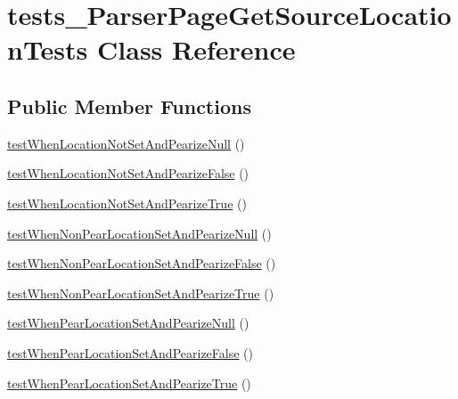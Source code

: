 \hypertarget{classtests___parser_page_get_source_location_tests}{\section{tests\-\_\-\-Parser\-Page\-Get\-Source\-Location\-Tests \-Class \-Reference}
\label{classtests___parser_page_get_source_location_tests}
}
\subsection*{\-Public \-Member \-Functions}
\begin{DoxyCompactItemize}
\item 
\hyperlink{classtests___parser_page_get_source_location_tests_ac721171dfac4984a048e8f71b69d5209}{test\-When\-Location\-Not\-Set\-And\-Pearize\-Null} ()
\item 
\hyperlink{classtests___parser_page_get_source_location_tests_adee1f0a89955b2592f877ae21b1b47b1}{test\-When\-Location\-Not\-Set\-And\-Pearize\-False} ()
\item 
\hyperlink{classtests___parser_page_get_source_location_tests_a053821b7694df0e44f991e7fbce97853}{test\-When\-Location\-Not\-Set\-And\-Pearize\-True} ()
\item 
\hyperlink{classtests___parser_page_get_source_location_tests_ac6de50e08eb4d513dcbe9390221a74dd}{test\-When\-Non\-Pear\-Location\-Set\-And\-Pearize\-Null} ()
\item 
\hyperlink{classtests___parser_page_get_source_location_tests_ad6c809f37460a96ddd5026a5d7420f6c}{test\-When\-Non\-Pear\-Location\-Set\-And\-Pearize\-False} ()
\item 
\hyperlink{classtests___parser_page_get_source_location_tests_a94bfc35295afbf47a5b1eb7883e508c6}{test\-When\-Non\-Pear\-Location\-Set\-And\-Pearize\-True} ()
\item 
\hyperlink{classtests___parser_page_get_source_location_tests_a37e70815dfa80be80feff06e6c9d240e}{test\-When\-Pear\-Location\-Set\-And\-Pearize\-Null} ()
\item 
\hyperlink{classtests___parser_page_get_source_location_tests_a2879e5607d6fef36117472e4d5ae2d31}{test\-When\-Pear\-Location\-Set\-And\-Pearize\-False} ()
\item 
\hyperlink{classtests___parser_page_get_source_location_tests_a79b0eb4fc9a73a3002fcde3654e235ca}{test\-When\-Pear\-Location\-Set\-And\-Pearize\-True} ()
\item 

\end{DoxyCompactItemize}
